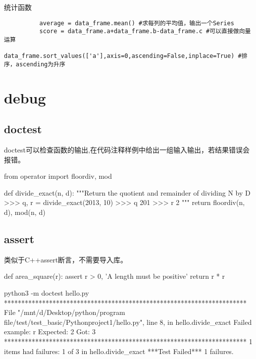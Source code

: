 \documentclass{article}
\begin{document}
        统计函数
        \begin{lstlisting}
          average = data_frame.mean() #求每列的平均值，输出一个Series
          score = data_frame.a+data_frame.b-data_frame.c #可以直接做向量运算
          data_frame.sort_values(['a'],axis=0,ascending=False,inplace=True) #排序，ascending为升序
        \end{lstlisting}

  \section{debug}

    \subsection{doctest}
      doctest可以检查函数的输出,在代码注释样例中给出一组输入输出，若结果错误会报错。
      \begin{codeblock}[language=python, caption={doctest hello.py}]
        from operator import floordiv, mod

        def divide_exact(n, d):
          """Return the quotient and remainder of  dividing N by D
          >>> q, r = divide_exact(2013, 10)
          >>> q
          201
          >>> r
          2
          """
          return floordiv(n, d), mod(n, d)
      \end{codeblock}

    \subsection{assert}
      类似于C++assert断言，不需要导入库。
      \begin{codeblock}[language=python, caption={assert in python}]
        def area_square(r):
          assert r > 0, 'A length must be positive'
          return r * r
      \end{codeblock}

      \begin{codeblock}[language=python, caption={doctest bash}]
        python3 -m doctest hello.py
        **********************************************************************
        File "/mnt/d/Desktop/python/program file/test/test_basic/Pythonproject1/hello.py", line 8, in hello.divide_exact
        Failed example:
            r
        Expected:
            2
        Got:
            3
        **********************************************************************
        1 items had failures:
          1 of   3 in hello.divide_exact
        ***Test Failed*** 1 failures.
      \end{codeblock}
\end{document}
